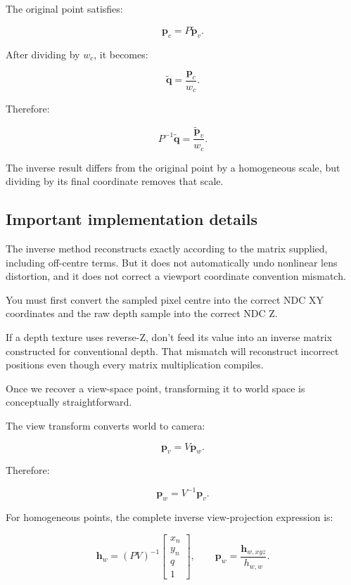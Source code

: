 \hypertarget{02-foundations-ii-ch035-why-this-works}{}

The original point satisfies:

\[ \mathbf p_c=P\tilde{\mathbf p}_v. \]

After dividing by \(w_c\), it becomes:

\[ \tilde{\mathbf q} = \frac{\mathbf p_c}{w_c}. \]

Therefore:

\[ P^{-1}\tilde{\mathbf q} = \frac{\tilde{\mathbf p}_v}{w_c}. \]

The inverse result differs from the original point by a homogeneous scale, but dividing by its final coordinate removes that scale.

\subsection{Important implementation details}\label{02-foundations-ii-ch035-important-implementation-details}

\hypertarget{02-foundations-ii-ch035-important-implementation-details}{}

The inverse method reconstructs exactly according to the matrix supplied, including off-centre terms. But it does not automatically undo nonlinear lens distortion, and it does not correct a viewport coordinate convention mismatch.

You must first convert the sampled pixel centre into the correct NDC XY coordinates and the raw depth sample into the correct NDC Z.

If a depth texture uses reverse-Z, don't feed its value into an inverse matrix constructed for conventional depth. That mismatch will reconstruct incorrect positions even though every matrix multiplication compiles.

Once we recover a view-space point, transforming it to world space is conceptually straightforward.

The view transform converts world to camera:

\[ \mathbf p_v=V\mathbf p_w. \]

Therefore:

\[ \boxed{ \mathbf p_w=V^{-1}\mathbf p_v. } \]

For homogeneous points, the complete inverse view-projection expression is:

\[ \boxed{ \mathbf h_w=(PV)^{-1} \begin{bmatrix} x_n\\y_n\\q\\1 \end{bmatrix}, \qquad \mathbf p_w=\frac{\mathbf h_{w,xyz}}{h_{w,w}}. } \]

